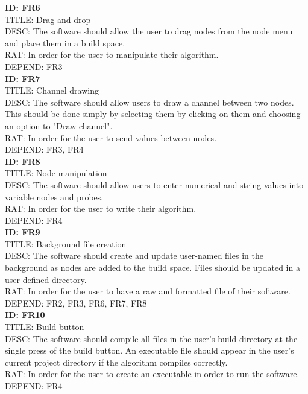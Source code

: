 \documentclass[journal,10pt,onecolumn,compsoc]{IEEEtran} \usepackage[margin=1.0in]{geometry} \usepackage{pdfpages} \usepackage{graphicx}
\begin{document}
\noindent
\textbf{ID: FR6}\\
TITLE: Drag and drop\\
DESC: The software should allow the user to drag nodes from the node menu and place them in a build space.\\
RAT: In order for the user to manipulate their algorithm.\\
DEPEND: FR3\\

\noindent
\textbf{ID: FR7}\\
TITLE: Channel drawing\\
DESC: The software should allow users to draw a channel between two nodes. 
This should be done simply by selecting them by clicking on them and choosing an option to "Draw channel".\\
RAT: In order for the user to send values between nodes.\\
DEPEND: FR3, FR4\\

\noindent
\textbf{ID: FR8}\\
TITLE: Node manipulation\\
DESC: The software should allow users to enter numerical and string values into variable nodes and probes.\\
RAT: In order for the user to write their algorithm.\\
DEPEND: FR4\\

\noindent
\textbf{ID: FR9}\\
TITLE: Background file creation\\
DESC: The software should create and update user-named files in the background as nodes are added to the build space. 
Files should be updated in a user-defined directory.\\
RAT: In order for the user to have a raw and formatted file of their software.\\
DEPEND: FR2, FR3, FR6, FR7, FR8\\

\noindent
\textbf{ID: FR10}\\
TITLE: Build button\\
DESC: The software should compile all files in the user's build directory at the single press of the build button. 
An executable file should appear in the user's current project directory if the algorithm compiles correctly.\\
RAT: In order for the user to create an executable in order to run the software.\\
DEPEND: FR4\\
\end{document}

